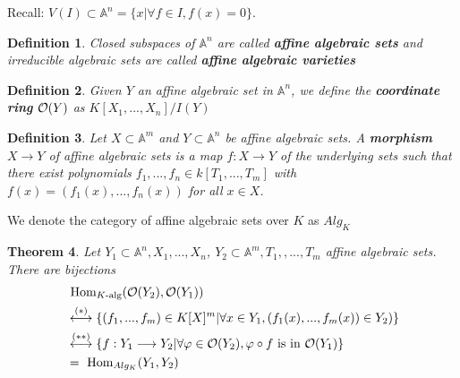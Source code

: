 \documentclass[11pt]{article}
\newtheorem{thm}{Theorem}[section]
\newtheorem{dfn}[thm]{Definition}
\renewcommand{\hom}{\text{ Hom}}
\newcommand{\affn}{\mathbb A}
\newcommand{\calo}{{\cal O}}
\newcommand{\lrta}{\longrightarrow}
\newcommand{\llrta}{\longleftrightarrow}
\begin{document}
Recall: $V(I)\subset \affn^n =\{x|\forall f\in I, f(x)=0\}$.
\begin{dfn}
Closed subspaces of $\affn^n$ are called \textbf{affine algebraic sets} and irreducible algebraic sets are called \textbf{affine algebraic varieties}
\end{dfn}
\begin{dfn}
Given $Y$ an affine algebraic set in $\affn^n$, we define the \textbf{coordinate ring} $\calo(Y)$ as $K[X_1,...,X_n]/I(Y)$
\end{dfn}
\begin{dfn}
Let $X\subset \affn^m$ and $Y \subset \affn^n$ be affine algebraic sets. A \textbf{morphism} $X \lrta Y$ of affine algebraic sets is a map $f : X \lrta Y$ of the underlying sets such that there exist polynomials $f_1,...,f_n \in k[T_1,...,T_m]$ with $f(x) = (f_1(x),...,f_n(x))$ for all $x\in X$. 
\end{dfn}
We denote the category of affine algebraic sets over $K$ as $Alg_K$
\begin{thm}\label{thm:equivalence_of_categories_algebraic_sets_K_algebras}
Let $Y_1\subset \affn^n, X_1,...,X_n$, $Y_2\subset \affn^m, T_1,,..., T_m$ affine algebraic sets. There are bijections 
$$
\begin{aligned}
&\hom_{K\text{-alg}}(\calo(Y_2),\calo(Y_1))
\\
&\overset{(*)}{\llrta}\{(f_1,...,f_m)\in K[X]^m|\forall x\in Y_1,(f_1(x),...,f_m(x))\in Y_2) \}\\
&\overset{(**)}{\llrta} \{f:Y_1\lrta Y_2|\forall \varphi\in \calo(Y_2),\varphi\circ f\text{ is  in }  \calo(Y_1)\}\\
&=\hom_{Alg_K}(Y_1,Y_2)
\end{aligned}
$$
\end{thm}
\end{document}
